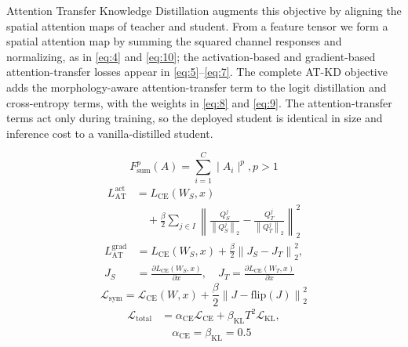 \documentclass[preprint,review,12pt]{elsarticle}
\begin{document}
Attention Transfer Knowledge Distillation augments this objective by
aligning the spatial attention maps of teacher and student. From a
feature tensor we form a spatial attention map by summing the squared
channel responses and normalizing, as in \eqref{eq:4} and \eqref{eq:10};
the activation-based and gradient-based attention-transfer losses appear
in \eqref{eq:5}--\eqref{eq:7}. The complete AT-KD objective adds the
morphology-aware attention-transfer term to the logit distillation and
cross-entropy terms, with the weights in \eqref{eq:8} and \eqref{eq:9}.
The attention-transfer terms act only during training, so the deployed
student is identical in size and inference cost to a vanilla-distilled
student.

\begin{equation}\label{eq:4}
F_{\text{sum}}^{p}(A) = \sum_{i = 1}^{C} \mid A_{i} \mid^{p},p > 1
\end{equation}
\begin{equation}\label{eq:5}
\begin{aligned}
L_{\text{AT}}^{\text{act}} &= L_{\text{CE}}(W_{S}, x) \\
&\quad + \frac{\beta}{2}\sum_{j \in I}\left\| \frac{Q_{S}^{j}}{\left\| Q_{S}^{j} \right\|_{2}} - \frac{Q_{T}^{j}}{\left\| Q_{T}^{j} \right\|_{2}} \right\|_{2}^{2}
\end{aligned}
\end{equation}
\begin{equation}\label{eq:6}
\begin{aligned}
L_{\text{AT}}^{\text{grad}} &= L_{\text{CE}}(W_{S}, x) + \frac{\beta}{2}\left\| J_{S} - J_{T} \right\|_{2}^{2}, \\
J_{S} &= \frac{\partial L_{\text{CE}}(W_{S}, x)}{\partial x}, \quad J_{T} = \frac{\partial L_{\text{CE}}(W_{T}, x)}{\partial x}
\end{aligned}
\end{equation}
\begin{equation}\label{eq:7}
\mathcal{L}_{\text{sym}} = \mathcal{L}_{\text{CE}}(W,x) + \frac{\beta}{2}\left\| J - \text{flip}(J) \right\|_{2}^{2}
\end{equation}
\begin{equation}\label{eq:8}
\begin{aligned}
\mathcal{L}_{\text{total}} &= \alpha_{\text{CE}}\mathcal{L}_{\text{CE}} + \beta_{\text{KL}}T^{2}\mathcal{L}_{\text{KL}}, \\
&\quad \alpha_{\text{CE}} = \beta_{\text{KL}} = 0.5
\end{aligned}
\end{equation}
\end{document}
